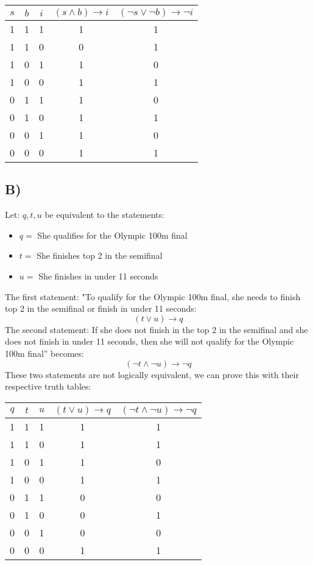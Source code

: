 \documentclass{article}
\begin{document}
\begin{table}[htp]
    \centering
    \begin{tabular}{|c|c|c|c|c|}
    \hline
        $s$ & $b$ & $i$ & $(s\land b) \rightarrow i$ & $(\lnot s \lor \lnot b) \rightarrow \lnot i$\\
    \hline
        1 & 1 & 1 & 1 & 1\\
    \hline
        1 & 1 & 0 & 0 & 1\\
    \hline
        1 & 0 & 1 & 1 & 0\\
    \hline
        1 & 0 & 0 & 1 & 1\\
    \hline
        0 & 1 & 1 & 1 & 0\\
    \hline
        0 & 1 & 0 & 1 & 1\\
    \hline
        0 & 0 & 1 & 1 & 0\\
    \hline
        0 & 0 & 0 & 1 & 1\\
    \hline
    \end{tabular}
\end{table}
\subsection*{B)}
Let: $q,t,u$ be equivalent to the statements:
\begin{itemize}
    \item $q = $ She qualifies for the Olympic 100m final
    \item $t = $ She finishes top 2 in the semifinal
    \item $u = $ She finishes in under 11 seconds
\end{itemize}
The first statement: "To qualify for the Olympic 100m final, she needs to finish top 2 in the semifinal or finish in under 11 seconds: $$(t \lor u) \rightarrow q$$
The second statement: If she does not finish in the top 2 in the semifinal and she does not finish in
under 11 seconds, then she will not qualify for the Olympic 100m final” becomes:$$(\lnot t \land \lnot u) \rightarrow \lnot q$$
These two statements are not logically equivalent, we can prove this with their respective truth tables:

\begin{table}[htp]
    \centering
    \begin{tabular}{|c|c|c|c|c|}
    \hline
        $q$ & $t$ & $u$ & $(t \lor u) \rightarrow q$ & $(\lnot t \land \lnot u) \rightarrow \lnot q$\\
    \hline
        1 & 1 & 1 & 1 & 1\\
    \hline
        1 & 1 & 0 & 1 & 1\\
    \hline
        1 & 0 & 1 & 1 & 0\\
    \hline
        1 & 0 & 0 & 1 & 1\\
    \hline
        0 & 1 & 1 & 0 & 0\\
    \hline
        0 & 1 & 0 & 0 & 1\\
    \hline
        0 & 0 & 1 & 0 & 0\\
    \hline
        0 & 0 & 0 & 1 & 1\\
    \hline
    \end{tabular}
\end{table}
\newpage
\end{document}
